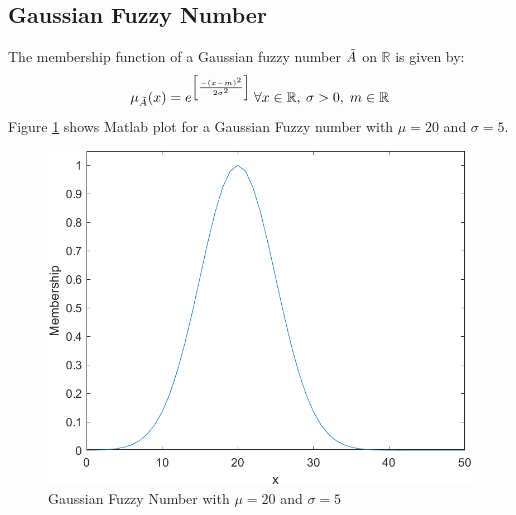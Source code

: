 \documentclass{article}
\begin{document}
\subsection{Gaussian Fuzzy Number}
The membership function of a Gaussian fuzzy number $\Tilde{A}$ on $\mathbb{R}$ is given by:
\begin{equation}
    \mu_ {\Tilde{A}} (x) = e^{\left[ \frac{-(x-m)^2}{2\sigma^{2}} \right]} \: \forall {x} \in \mathbb{R}, \: \sigma > 0,\; m\in \mathbb{R}
\end{equation}
Figure \ref{fig:gaussno} shows Matlab plot for a Gaussian Fuzzy number with $\mu = 20$ and $\sigma = 5$.

\begin{figure}
    \centering
    \includegraphics[scale=0.6]{gaussno.png}
    \caption{\label{fig:gaussno} Gaussian Fuzzy Number with $\mu = 20$ and $\sigma = 5$}
    \label{fig:gaussno}
\end{figure}
\end{document}
